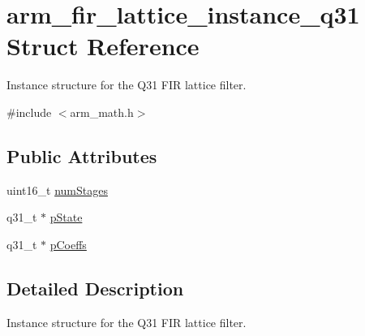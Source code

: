 \hypertarget{structarm__fir__lattice__instance__q31}{\section{arm\-\_\-fir\-\_\-lattice\-\_\-instance\-\_\-q31 Struct Reference}
\label{structarm__fir__lattice__instance__q31}
}


Instance structure for the Q31 F\-I\-R lattice filter.  




{\ttfamily \#include $<$arm\-\_\-math.\-h$>$}

\subsection*{Public Attributes}
\begin{DoxyCompactItemize}
\item 
uint16\-\_\-t \hyperlink{structarm__fir__lattice__instance__q31_a9f3773bbb76bc5a8a5ee9d37786bf478}{num\-Stages}
\item 
q31\-\_\-t $\ast$ \hyperlink{structarm__fir__lattice__instance__q31_a08fe9494ab7cd336b791e9657adadcf6}{p\-State}
\item 
q31\-\_\-t $\ast$ \hyperlink{structarm__fir__lattice__instance__q31_a66c3364bf5863cd45e05f1652c3dc522}{p\-Coeffs}
\end{DoxyCompactItemize}


\subsection{Detailed Description}
Instance structure for the Q31 F\-I\-R lattice filter. 

